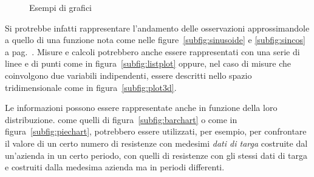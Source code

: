 \begin{figure}[htp!]
\qquad
 \caption{Esempi di grafici}
 \label{fig:esempi_grafici}%
\end{figure}

Si protrebbe infatti rappresentare l'andamento delle osservazioni approssimandole a quello di una funzione nota come nelle figure~\ref{subfig:sinusoide} e \ref{subfig:sincos} a pag.~\pageref{fig:esempi_grafici}. Misure e calcoli potrebbero anche essere rappresentati con una serie di linee e di punti come in figura~\ref{subfig:listplot} oppure, nel caso di misure che coinvolgono due variabili indipendenti, essere descritti nello spazio tridimensionale come in figura~\ref{subfig:plot3d}.

Le informazioni possono essere rappresentate anche in funzione della loro distribuzione.  come quelli di figura~\ref{subfig:barchart} o  come in figura~\ref{subfig:piechart}, potrebbero essere utilizzati, per esempio, per confrontare il valore di un certo numero di resistenze con medesimi \textit{dati di targa} costruite dal un'azienda in un certo periodo, con quelli di resistenze con gli stessi dati di targa e costruiti dalla medesima azienda ma in periodi differenti.


